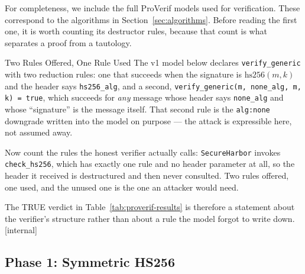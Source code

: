 \documentclass[11pt,a4paper]{article}
\theoremstyle{definition}
\begin{document}
For completeness, we include the full ProVerif models used for verification. These correspond to the algorithms in Section~\ref{sec:algorithms}. Before reading the first one, it is worth counting its destructor rules, because that count is what separates a proof from a tautology.

\begin{pdexample}{Two Rules Offered, One Rule Used}
\setlength{\parskip}{4pt plus 1pt}
The v1 model below declares \texttt{verify\_generic} with two reduction rules:
one that succeeds when the signature is $\mathrm{hs256}(m,k)$ and the header
says \texttt{hs256\_alg}, and a second, \texttt{verify\_generic(m, none\_alg,
m, k) = true}, which succeeds for \emph{any} message whose header says
\texttt{none\_alg} and whose ``signature'' is the message itself. That second
rule is the \texttt{alg:none} downgrade written into the model on purpose ---
the attack is expressible here, not assumed away.

Now count the rules the
honest verifier actually calls: \texttt{SecureHarbor} invokes
\texttt{check\_hs256}, which has exactly one rule and no header parameter at
all, so the header it received is destructured and then never consulted. Two
rules offered, one used, and the unused one is the one an attacker would
need.

The TRUE verdict in Table~\ref{tab:proverif-results} is therefore a
statement about the verifier's structure rather than about a rule the model
forgot to write down. [internal]
\end{pdexample}

\subsection{Phase 1: Symmetric HS256}
\end{document}
